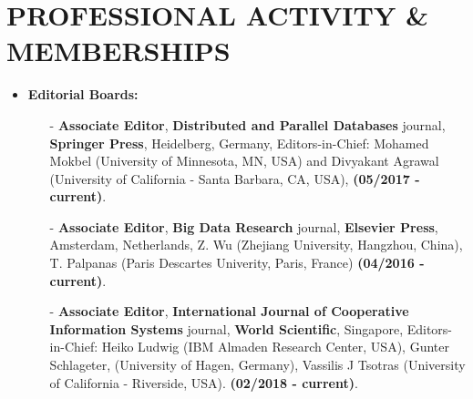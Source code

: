 \documentclass[10pt]{article}
\begin{document}
\section{\bf PROFESSIONAL ACTIVITY \& MEMBERSHIPS}
\begin{itemize}
\setlength{\itemsep}{0.80ex}
\item {\bf Editorial Boards:}
\begin{itemize}
\item[-] {\bf Associate Editor}, {\bf Distributed and Parallel Databases} journal, {\bf Springer Press}, Heidelberg, Germany, Editors-in-Chief: Mohamed Mokbel (University of Minnesota, MN, USA) and Divyakant Agrawal (University of California - Santa Barbara, CA, USA), {\bf (05/2017 - current)}.
\item[-] {\bf Associate Editor}, {\bf Big Data Research} journal, {\bf Elsevier Press}, Amsterdam, Netherlands, Z. Wu (Zhejiang University, Hangzhou, China), T. Palpanas (Paris Descartes Univerity, Paris, France) {\bf (04/2016 - current)}.
\item[-] {\bf Associate Editor}, {\bf International Journal of Cooperative Information Systems} journal, {\bf World Scientific},  Singapore, Editors-in-Chief: Heiko Ludwig (IBM Almaden Research Center, USA), Gunter Schlageter, (University of Hagen, Germany), Vassilis J Tsotras (University of California - Riverside, USA). {\bf (02/2018 - current)}.

\end{itemize}


\end{itemize}
\end{document}
